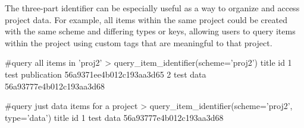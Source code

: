 The three-part identifier can be especially useful as a way to
organize and access project data. For example, all items within the same project
could be created with the same scheme and differing types or keys, allowing
users to query items within the project using custom tags that are meaningful to
that project.

\begin{example}
#query all items in 'proj2'
> query_item_identifier(scheme='proj2')
             title                       id
1 test publication 56a9371ee4b012c193aa3d65
2        test data 56a93777e4b012c193aa3d68

#query just data items for a project
> query_item_identifier(scheme='proj2', type='data')
      title                       id
1 test data 56a93777e4b012c193aa3d68
\end{example}
